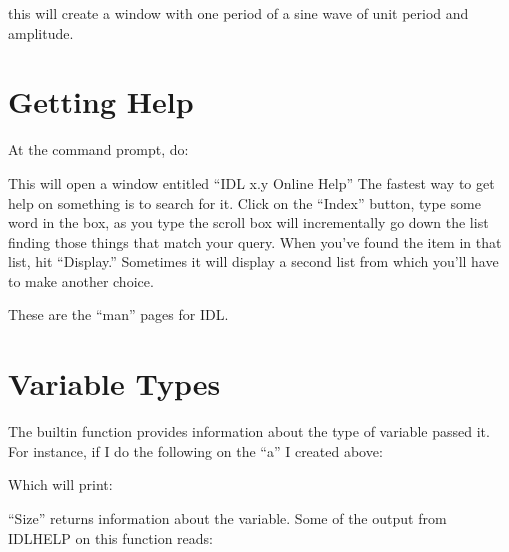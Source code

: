 \documentclass{article}
\begin{document}


   this will create a window with one period of a sine wave of unit
   period and amplitude.


\section{Getting Help}

  At the command prompt, do:


  This will open a window entitled ``IDL x.y Online Help'' The fastest
  way to get help on something is to search for it. Click on the
  ``Index'' button, type some word in the box, as you type the scroll
  box will incrementally go down the list finding those things that
  match your query. When you've found the item in that list, hit
  ``Display.'' Sometimes it will display a second list from which
  you'll have to make another choice.

  These are the ``man'' pages for IDL.

\newpage
\section{Variable Types}\label{sec:types}

   The  builtin function provides information about the
   type of variable passed it.  For instance, if I do the following on
   the ``a'' I created above:



   Which will print:


   ``Size'' returns information about the variable. Some of the output
   from IDLHELP on this function reads:




\end{document}
